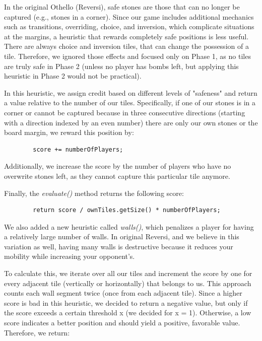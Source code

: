 \begin{enumerate}
        \noindent In the original Othello (Reversi), safe stones are those that can no longer be captured (e.g., stones in a corner). Since our game includes additional mechanics such as transitions, overriding, choice, and inversion, which complicate situations at the margins, a heuristic that rewards completely safe positions is less useful. There are always choice and inversion tiles, that can change the possession of a tile.  Therefore, we ignored those effects and focused only on Phase 1, as no tiles are truly safe in Phase 2 (unless no player has bombs left, but applying this heuristic in Phase 2 would not be practical).
        
        \noindent In this heuristic, we assign credit based on different levels of "safeness" and return a value relative to the number of our tiles. Specifically, if one of our stones is in a corner or cannot be captured because in three consecutive directions (starting with a direction indexed by an even number) there are only our own stones or the board margin, we reward this position by:
        
        \begin{lstlisting}
        score += numberOfPlayers;
        \end{lstlisting}
        
        \noindent Additionally, we increase the score by the number of players who have no overwrite stones left, as they cannot capture this particular tile anymore.
        
        \noindent Finally, the \textit{evaluate()} method returns the following score:
        
        \begin{lstlisting}
        return score / ownTiles.getSize() * numberOfPlayers;
        \end{lstlisting}
        
        \noindent We also added a new heuristic called \textit{walls()}, which penalizes a player for having a relatively large number of walls. In original Reversi, and we believe in this variation as well, having many walls is destructive because it reduces your mobility while increasing your opponent's.
        
        \noindent To calculate this, we iterate over all our tiles and increment the score by one for every adjacent tile (vertically or horizontally) that belongs to us. This approach counts each wall segment twice (once from each adjacent tile). Since a higher score is bad in this heuristic, we decided to return a negative value, but only if the score exceeds a certain threshold x (we decided for x = 1). Otherwise, a low score indicates a better position and should yield a positive, favorable value. Therefore, we return:
        

\end{enumerate}
